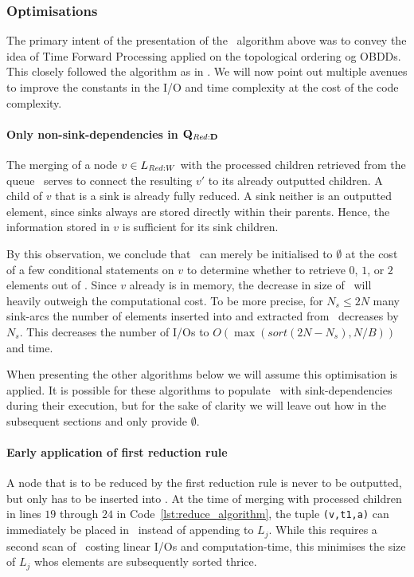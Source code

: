 \newpage
\subsubsection{Optimisations} \label{sec:reduce_optimisations}
The primary intent of the presentation of the \Reduce\ algorithm above was to
convey the idea of Time Forward Processing applied on the topological ordering
og OBDDs. This closely followed the algorithm as in \cite{Arge96}. We will now
point out multiple avenues to improve the constants in the I/O and time
complexity at the cost of the code complexity.

\paragraph{Only non-sink-dependencies in $\mathbf{Q_{\mathit{Red:}D}}$}
The merging of a node $v \in L_{\mathit{Red:}W}$ with the processed children retrieved
from the queue \ReduceQdep\ serves to connect the resulting $v'$ to its already
outputted children. A child of $v$ that is a sink is already fully reduced. A
sink neither is an outputted element, since sinks always are stored directly
within their parents. Hence, the information stored in $v$ is sufficient for its
sink children.

By this observation, we conclude that \ReduceQdep\ can merely be initialised to
$\emptyset$ at the cost of a few conditional statements on $v$ to determine
whether to retrieve $0$, $1$, or $2$ elements out of \ReduceQdep. Since $v$
already is in memory, the decrease in size of \ReduceQdep\ will heavily outweigh
the computational cost. To be more precise, for $N_s \leq 2N$ many sink-arcs the
number of elements inserted into and extracted from \ReduceQdep\ decreases by
$N_s$. This decreases the number of I/Os to $O(\max(sort(2N - N_s),N/B))$ and
time.


When presenting the other algorithms below we will assume this optimisation is
applied. It is possible for these algorithms to populate \ReduceQdep\ with
sink-dependencies during their execution, but for the sake of clarity we will
leave out how in the subsequent sections and only provide $\emptyset$.

\paragraph{Early application of first reduction rule}
A node that is to be reduced by the first reduction rule is never to be
outputted, but only has to be inserted into \ReduceQdep. At the time of merging
with processed children in lines $19$ through $24$ in
Code~\ref{lst:reduce_algorithm}, the tuple \lstinline{(v,t1,a)} can immediately
be placed in \ReduceQdep\ instead of appending to $L_j$. While this requires a
second scan of \ReduceLdep\ costing linear I/Os and computation-time, this
minimises the size of $L_j$ whos elements are subsequently sorted thrice.

